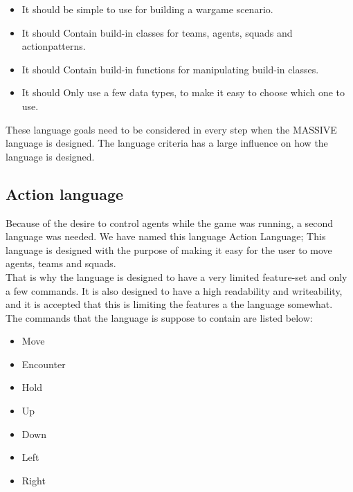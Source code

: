 \begin{itemize}
	\item It should be simple to use for building a wargame scenario.
	\item It should Contain build-in classes for teams, agents, squads and actionpatterns.
	\item It should Contain build-in functions for manipulating build-in classes.
	\item It should Only use a few data types, to make it easy to choose which one to use.
\end{itemize}

These language goals need to be considered in every step when the MASSIVE language is designed.
The language criteria has a large influence on how the language is designed.

\subsection{Action language}
Because of the desire to control agents while the game was running, a second language was needed. We have named this language Action Language; This language is designed with the purpose of making it easy for the user to move agents, teams and squads.\\
That is why the language is designed to have a very limited feature-set and only a few commands. It is also designed to have a high readability and writeability, and it is accepted that this is limiting the features a the language somewhat. \\
The commands that the language is suppose to contain are listed below:

\begin{itemize}
	\item Move
	\item Encounter
	\item Hold
	\item Up
	\item Down
	\item Left
	\item Right
\end{itemize}